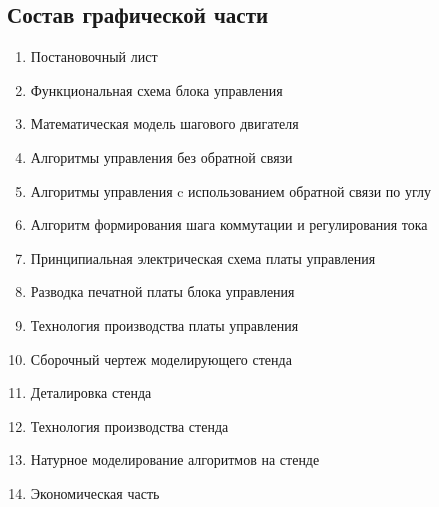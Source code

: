 \subsection{Состав графической части}
\begin{enumerate}
    \item Постановочный лист
    \item Функциональная схема блока управления
    \item Математическая модель шагового двигателя
    \item Алгоритмы управления без обратной связи
    \item Алгоритмы управления c использованием обратной связи по углу
    \item Алгоритм формирования шага коммутации и регулирования тока
    \item Принципиальная электрическая схема платы управления
    \item Разводка печатной платы блока управления
    \item Технология производства платы управления
    \item Сборочный чертеж моделирующего стенда
    \item Деталировка стенда
    \item Технология производства стенда
    \item Натурное моделирование алгоритмов на стенде
    \item Экономическая часть
\end{enumerate}

